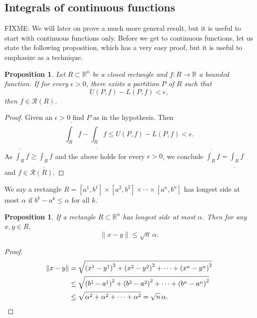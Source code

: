 \documentclass[12pt]{book}
\newcommand{\snorm}[1]{\lVert {#1} \rVert}
\newcommand{\R}{{\mathbb{R}}}
\newcommand{\sR}{{\mathcal{R}}}
\theoremstyle{plain}
\newtheorem{prop}[thm]{Proposition}
\theoremstyle{remark}
\theoremstyle{definition}
\theoremstyle{exercise}
\theoremstyle{example}
\begin{document}
\subsection{Integrals of continuous functions}

FIXME:
We will later on prove a much more general result, but it is useful to start
with continuous functions only.  Before we get to continuous functions,
let us state the following proposition, which has a very easy proof,
but it is useful to 
emphasize as a technique.

\begin{prop}
Let $R \subset \R^n$ be a closed rectangle and
$f \colon R \to \R$ a bounded function.
If for every $\epsilon > 0$, there exists a partition $P$ of $R$
such that
\begin{equation*}
U(P,f) - L(P,f) < \epsilon ,
\end{equation*}
then $f \in \sR(R)$.
\end{prop}

\begin{proof}
Given an $\epsilon > 0$ find $P$ as in the hypothesis.  Then
\begin{equation*}
\overline{\int_R} f - 
\underline{\int_R} f 
\leq
U(P,f) - L(P,f)
< \epsilon .
\end{equation*}
As $\overline{\int_R} f \geq \underline{\int_R} f$ and the above holds for
every $\epsilon > 0$, we conclude 
$\overline{\int_R} f = \underline{\int_R} f$ and $f \in \sR(R)$.
\end{proof}

We say a rectangle $R = [a^1,b^1] \times
[a^2,b^2] \times \cdots \times
[a^n,b^n]$ has longest side at most $\alpha$ if
$b^k-a^k \leq \alpha$ for all $k$.

\begin{prop}
If a rectangle $R \subset \R^n$ has longest side at most $\alpha$.  Then
for any $x,y \in R$,
\begin{equation*}
\snorm{x-y} \leq \sqrt{n} \, \alpha .
\end{equation*}
\end{prop}

\begin{proof}
\begin{equation*}
\begin{split}
\snorm{x-y} 
& =
\sqrt{
{(x^1-y^1)}^2
+
{(x^2-y^2)}^2
+ \cdots +
{(x^n-y^n)}^2
}
\\
& \leq
\sqrt{
{(b^1-a^1)}^2
+
{(b^2-a^2)}^2
+ \cdots +
{(b^n-a^n)}^2
}
\\
& \leq
\sqrt{
{\alpha}^2
+
{\alpha}^2
+ \cdots +
{\alpha}^2
}
=
\sqrt{n} \, \alpha .  \qedhere
\end{split}
\end{equation*}
\end{proof}
\end{document}
